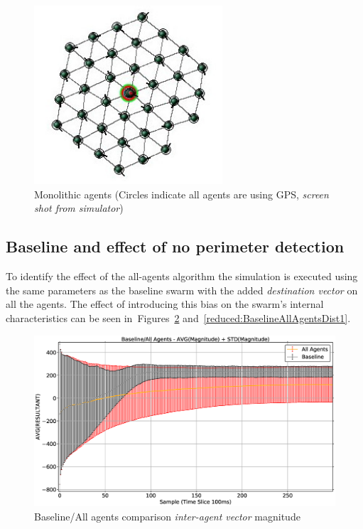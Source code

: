 \begin{figure}[H]
\begin{center}
\includegraphics[width=7cm]{CHAPTER-6/figures/Monolithic2}
\end{center}
\caption[Monolithic agents]{Monolithic agents (Circles indicate all agents are using GPS, \textit{screen shot from simulator}) \label{reduced:Monolithic1}}
\end{figure}

\subsection{Baseline and effect of no perimeter detection\label{section:compareBaselineNoPerimeter}}
To identify the effect of the all-agents algorithm the simulation is executed using the same parameters as the baseline swarm with the added \textit{destination vector} on all the agents. The effect of introducing this bias on the swarm's internal characteristics can be seen in~Figures~\ref{reduced:BaselineAllAgentsMag1} and~\ref{reduced:BaselineAllAgentsDist1}.
\begin{figure}[H]
\begin{center}
\includegraphics[width=14cm]{CHAPTER-6/figures/BaselineAllAgentsMag1}
\end{center}
\caption{Baseline/All agents comparison \textit{inter-agent vector} magnitude\label{reduced:BaselineAllAgentsMag1}}
\end{figure}

